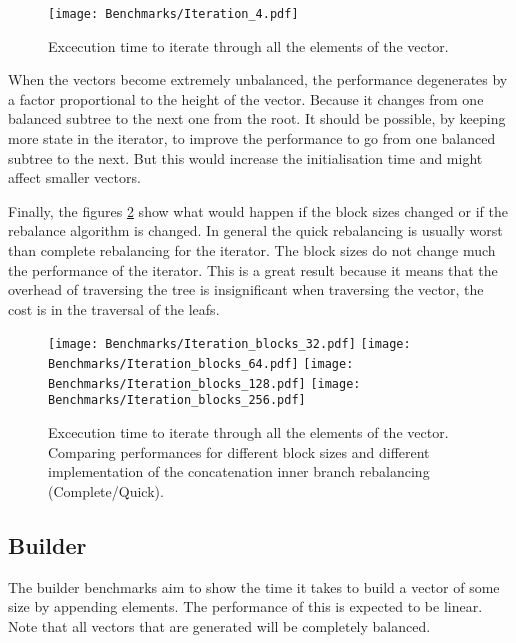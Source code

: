 \begin{figure}[h!]
  \centering
  \texttt{[image: Benchmarks/Iteration\_4.pdf]}
  \caption{Excecution time to iterate through all the elements of the vector.}
  \label{Iteration3Benchmarks}
\end{figure}

When the vectors become extremely unbalanced, the performance degenerates by a factor proportional to the height of the vector. Because it changes from one balanced subtree to the next one from the root. It should be possible, by keeping more state in the iterator, to improve the performance to go from one balanced subtree to the next. But this would increase the initialisation time and might affect smaller vectors.

\FloatBarrier

Finally, the figures \ref{IterationBlocksBenchmarks} show what would happen if the block sizes changed or if the rebalance algorithm is changed. In general the quick rebalancing is usually worst than complete rebalancing for the iterator. The block sizes do not change much the performance of the iterator. This is a great result because it means that the overhead of traversing the tree is insignificant when traversing the vector, the cost is in the traversal of the leafs.

\begin{figure}[h!]
  \centering
  \texttt{[image: Benchmarks/Iteration\_blocks\_32.pdf]}
  \texttt{[image: Benchmarks/Iteration\_blocks\_64.pdf]}
  \texttt{[image: Benchmarks/Iteration\_blocks\_128.pdf]}
  \texttt{[image: Benchmarks/Iteration\_blocks\_256.pdf]}
  \caption{Excecution time to iterate through all the elements of the vector. Comparing performances for different block sizes and different implementation of the concatenation inner branch rebalancing (Complete/Quick).}
  \label{IterationBlocksBenchmarks}
\end{figure}

\FloatBarrier

\subsection{Builder}
The builder benchmarks aim to show the time it takes to build a vector of some size by appending elements. The performance of this is expected to be linear. Note that all vectors that are generated will be completely balanced.

